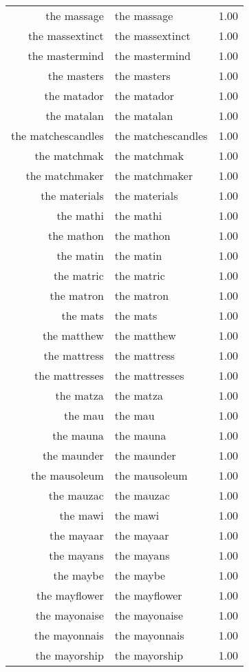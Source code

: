 \begin{table}[ht]
\begin{tabular}{rlr}
  the massage & the massage & 1.00 \\ 
  the massextinct & the massextinct & 1.00 \\ 
  the mastermind & the mastermind & 1.00 \\ 
  the masters & the masters & 1.00 \\ 
  the matador & the matador & 1.00 \\ 
  the matalan & the matalan & 1.00 \\ 
  the matchescandles & the matchescandles & 1.00 \\ 
  the matchmak & the matchmak & 1.00 \\ 
  the matchmaker & the matchmaker & 1.00 \\ 
  the materials & the materials & 1.00 \\ 
  the mathi & the mathi & 1.00 \\ 
  the mathon & the mathon & 1.00 \\ 
  the matin & the matin & 1.00 \\ 
  the matric & the matric & 1.00 \\ 
  the matron & the matron & 1.00 \\ 
  the mats & the mats & 1.00 \\ 
  the matthew & the matthew & 1.00 \\ 
  the mattress & the mattress & 1.00 \\ 
  the mattresses & the mattresses & 1.00 \\ 
  the matza & the matza & 1.00 \\ 
  the mau & the mau & 1.00 \\ 
  the mauna & the mauna & 1.00 \\ 
  the maunder & the maunder & 1.00 \\ 
  the mausoleum & the mausoleum & 1.00 \\ 
  the mauzac & the mauzac & 1.00 \\ 
  the mawi & the mawi & 1.00 \\ 
  the mayaar & the mayaar & 1.00 \\ 
  the mayans & the mayans & 1.00 \\ 
  the maybe & the maybe & 1.00 \\ 
  the mayflower & the mayflower & 1.00 \\ 
  the mayonaise & the mayonaise & 1.00 \\ 
  the mayonnais & the mayonnais & 1.00 \\ 
  the mayorship & the mayorship & 1.00 \\ 

\end{tabular}
\end{table}
